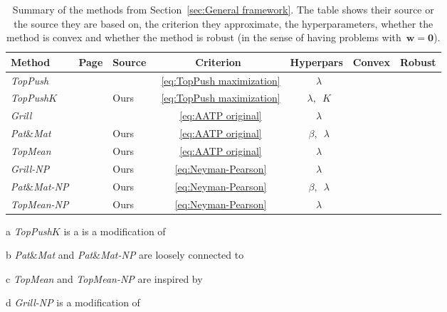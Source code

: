 \documentclass[11pt,a4paper]{article}
\theoremstyle{definition}
\newcommand{\headcol}{\rowcolor{gray!25}}
\newcommand{\cmark}{\textcolor{mygreen}{\ding{51}}}
\newcommand{\xmark}{\textcolor{myred}{\ding{55}}}
\newcommand{\toppush}{\textit{TopPush}\xspace}
\newcommand{\toppushk}{\textit{TopPush$K$}\xspace}
\newcommand{\grill}{\textit{Grill}\xspace}
\newcommand{\patmat}{\textit{Pat}\textup{\&}\textit{Mat}\xspace}
\newcommand{\topmean}{\textit{TopMean}\xspace}
\newcommand{\grillnp}{\textit{Grill-NP}\xspace}
\newcommand{\patmatnp}{\textit{Pat}\textup{\&}\textit{Mat-NP}\xspace}
\newcommand{\topmeannp}{\textit{TopMean-NP}\xspace}
\begin{document}
\begin{table}[!ht]
  \caption{Summary of the methods from Section~\ref{sec:General framework}. The table shows their source or the source they are based on, the criterion they approximate, the hyperparameters, whether the method is convex and whether the method is robust (in the sense of having problems with~$\bm{w} = \bm{0}$).}
  \label{tab:Methods}
  \centering
  \begin{threeparttable}[b]
    \begin{tabular}{@{} lclcccc @{}}
      \toprule
      \bf Method & \bf Page                            & \bf Source               & \bf Criterion                   & \bf Hyperpars      & \bf Convex & \bf Robust \\
      \midrule
      \toppush   & \pageref{eq:TopPush}                & \cite{li2014top}         &~\eqref{eq:TopPush maximization} &~$\lambda$          & \cmark     & \xmark\\
      \toppushk  & \pageref{eq:TopPushK}               & Ours\tnote{a}            &~\eqref{eq:TopPush maximization} &~$\lambda,$~$K$     & \cmark     & \xmark\\ \headcol
      \grill     & \pageref{eq:Grill}                  & \cite{grill2016learning} &~\eqref{eq:AATP original}        &~$\lambda$          & \xmark     & \cmark\\ \headcol
      \patmat    & \pageref{eq:PatMat}                 & Ours\tnote{b}            &~\eqref{eq:AATP original}        &~$\beta,$~$\lambda$ & \cmark     & \cmark\\ \headcol
      \topmean   & \pageref{eq:TopMean}                & Ours\tnote{c}            &~\eqref{eq:AATP original}        &~$\lambda$          & \cmark     & \xmark\\
      \grillnp   & \pageref{eq:Grill Neyman-Pearson}   & Ours\tnote{d}            &~\eqref{eq:Neyman-Pearson}       &~$\lambda$          & \xmark     & \cmark\\
      \patmatnp  & \pageref{eq:PatMat Neyman-Pearson}  & Ours\tnote{b}            &~\eqref{eq:Neyman-Pearson}       &~$\beta,$~$\lambda$ & \cmark     & \cmark\\
      \topmeannp & \pageref{eq:TopMean Neyman-Pearson} & Ours\tnote{c}            &~\eqref{eq:Neyman-Pearson}       &~$\lambda$          & \cmark     & \xmark\\
      \bottomrule
    \end{tabular}
  \begin{tablenotes}
    \item[a] \toppushk is a is a modification of~\cite{li2014top}
    \item[b] \patmat and \patmatnp are loosely connected to~\cite{rockafellar2000optimization}
    \item[c] \topmean and \topmeannp are inspired by~\cite{lapin2015top}
    \item[d] \grillnp is a modification of~\cite{grill2016learning}
  \end{tablenotes}
  \end{threeparttable}
\end{table}
\end{document}
